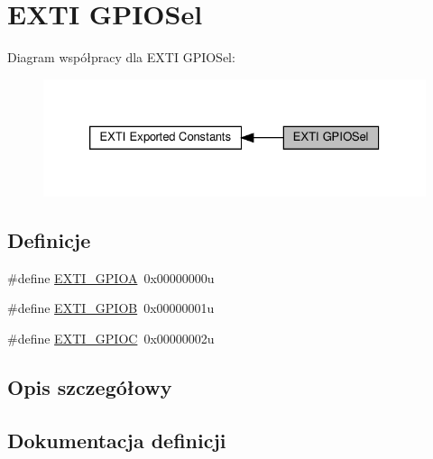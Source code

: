 \hypertarget{group___e_x_t_i___g_p_i_o_sel}{}\section{E\+X\+TI G\+P\+I\+O\+Sel}
\label{group___e_x_t_i___g_p_i_o_sel}
Diagram współpracy dla E\+X\+TI G\+P\+I\+O\+Sel\+:\nopagebreak
\begin{figure}[H]
\begin{center}
\leavevmode
\includegraphics[width=326pt]{group___e_x_t_i___g_p_i_o_sel}
\end{center}
\end{figure}
\subsection*{Definicje}
\begin{DoxyCompactItemize}
\item 
\#define \hyperlink{group___e_x_t_i___g_p_i_o_sel_ga562f178c10011ea8de3721d400176558}{E\+X\+T\+I\+\_\+\+G\+P\+I\+OA}~0x00000000u
\item 
\#define \hyperlink{group___e_x_t_i___g_p_i_o_sel_ga226a2e7987e1e808eff168985d378641}{E\+X\+T\+I\+\_\+\+G\+P\+I\+OB}~0x00000001u
\item 
\#define \hyperlink{group___e_x_t_i___g_p_i_o_sel_gaa74b8f490a793f237c6a55f56ba6e644}{E\+X\+T\+I\+\_\+\+G\+P\+I\+OC}~0x00000002u
\end{DoxyCompactItemize}


\subsection{Opis szczegółowy}


\subsection{Dokumentacja definicji}
\mbox{\label{group___e_x_t_i___g_p_i_o_sel_ga562f178c10011ea8de3721d400176558}} 
